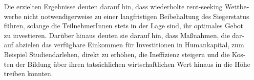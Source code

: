 \begin{otherlanguage}{ngerman}
\begin{small}
\vspace{-2mm}
Die erzielten Ergebnisse deuten darauf hin, dass wiederholte rent-seeking Wettbewerbe nicht notwendigerweise zu einer langfristigen Beibehaltung des  Siegerstatus führen, solange die TeilnehmerInnen stets in der Lage sind, ihr optimales Gebot zu investieren. Darüber hinaus deuten sie darauf hin, dass Maßnahmen, die darauf abzielen das verfügbare Einkommen für Investitionen in Humankapital, zum Beispiel Studiendarlehen, direkt zu erhöhen, die Ineffizienz steigern und die Kosten der Bildung über ihren tatsächlichen wirtschaftlichen Wert hinaus in die Höhe treiben könnten.
\end{small}
\end{otherlanguage}